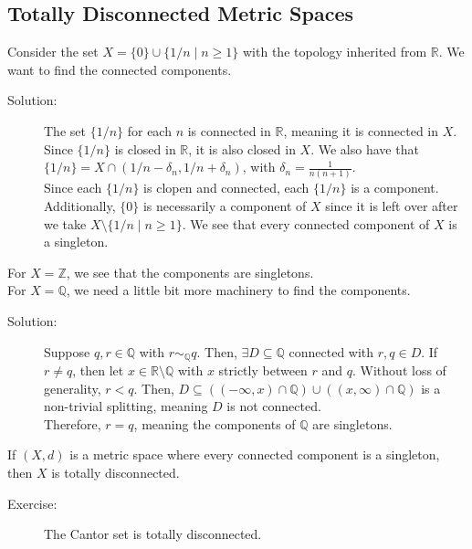 \documentclass[9pt]{extarticle}
\newcommand{\Q}{\mathbb{Q}}
\newcommand{\Z}{\mathbb{Z}}
\newcommand{\R}{\mathbb{R}}
\begin{document}
  \subsection{Totally Disconnected Metric Spaces}%
  Consider the set $X = \{0\} \cup \{1/n\mid n\geq 1\}$ with the topology inherited from $\R$. We want to find the connected components.
  \begin{description}
    \item[Solution:] The set $\{1/n\}$ for each $n$ is connected in $\R$, meaning it is connected in $X$. Since $\{1/n\}$ is closed in $\R$, it is also closed in $X$. We also have that $\{1/n\} = X\cap (1/n - \delta_n,1/n + \delta_n)$, with $\delta_n = \frac{1}{n(n+1)}$.\\

      Since each $\{1/n\}$ is clopen and connected, each $\{1/n\}$ is a component. Additionally, $\{0\}$ is necessarily a component of $X$ since it is left over after we take $X \setminus \{1/n\mid n\geq 1\}$. We see that every connected component of $X$ is a singleton.
  \end{description}
  For $X=\Z$, we see that the components are singletons.\\

  For $X = \Q$, we need a little bit more machinery to find the components.
  \begin{description}
    \item[Solution:] Suppose $q,r\in\Q$ with $r\sim_{\Q}q$. Then, $\exists D\subseteq \Q$ connected with $r,q\in D$. If $r\neq q$, then let $x\in \R\setminus \Q$ with $x$ strictly between $r$ and $q$. Without loss of generality, $r < q$. Then, $D\subseteq \left((-\infty,x)\cap \Q\right) \cup \left((x,\infty)\cap \Q\right)$ is a non-trivial splitting, meaning $D$ is not connected.\\

      Therefore, $r = q$, meaning the components of $\Q$ are singletons.
  \end{description}
  If $(X,d)$ is a metric space where every connected component is a singleton, then $X$ is totally disconnected.
  \begin{description}
    \item[Exercise:] The Cantor set is totally disconnected.
  \end{description}
\end{document}
